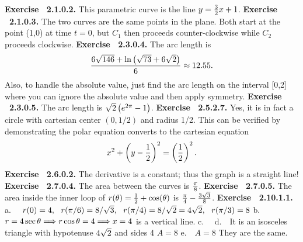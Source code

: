  {\noindent \protect \bf  Exercise ~2.1.0.2.} This parametric curve is the line $y=\protect \frac  {3}{2}x+1$. \protect \newline  \protect \newline  
 {\noindent \protect \bf  Exercise ~2.1.0.3.} The two curves are the same points in the plane. Both start at the point (1,0) at time $t=0$, but $C_1$ then proceeds counter-clockwise while $C_2$ proceeds clockwise. \protect \newline  \protect \newline  
 {\noindent \protect \bf  Exercise ~2.3.0.4.} The arc length is $$\protect \frac  {6\protect \sqrt  {146}+\protect \qopname  \relax o{ln}\left (\protect \sqrt  {73}+6\protect \sqrt  {2}\right )}{6}\approx 12.55.$$ Also, to handle the absolute value, just find the arc length on the interval [0,2] where you can ignore the absolute value and then apply symmetry. \protect \newline  \protect \newline  
 {\noindent \protect \bf  Exercise ~2.3.0.5.} The arc length is $\protect \sqrt  {2}\left (e^{2\pi }-1\right )$. \protect \newline  \protect \newline  
 {\noindent \protect \bf  Exercise ~2.5.2.7.} Yes, it is in fact a circle with cartesian center $\left (0,1/2\right )$ and radius 1/2. This can be verified by demonstrating the polar equation converts to the cartesian equation $$x^2+\left (y-\protect \frac  {1}{2}\right )^2=\left (\protect \frac  {1}{2}\right )^2. $$ \protect \newline  \protect \newline  
 {\noindent \protect \bf  Exercise ~2.6.0.2.} The derivative is a constant; thus the graph is a straight line! \protect \newline  \protect \newline  
 {\noindent \protect \bf  Exercise ~2.7.0.4.} The area between the curves is $\protect \frac  {\pi }{8}$. \protect \newline  \protect \newline  
 {\noindent \protect \bf  Exercise ~2.7.0.5.} The area inside the inner loop of $r(\theta )=\protect \frac  {1}{2}+\protect \qopname  \relax o{cos}(\theta )$ is $\protect \frac  {\pi }{4}-\protect \frac  {3\protect \sqrt  {3}}{8}$. \protect \newline  \protect \newline  
 {\noindent \protect \bf  Exercise ~2.10.1.1.} a.~~ $r(0) = 4,~~r(\pi /6) = 8/\protect \sqrt  {3},~~r(\pi /4) =8/\protect \sqrt  {2}=4\protect \sqrt  {2},~~r(\pi /3)= 8 $ b.~~ $r=4\protect \qopname  \relax o{sec}{\theta } \DOTSB \protect \Relbar \protect \joinrel \Rightarrow r \protect \qopname  \relax o{cos}{\theta } = 4 \DOTSB \protect \Relbar \protect \joinrel \Rightarrow x=4$ is a vertical line. c.~~ d.~~It is an isosceles triangle with hypotenuse $4\protect \sqrt  {2}$ and sides 4 $A=8$ e.~~$A=8$ They are the same.  \protect \newline  \protect \newline  

